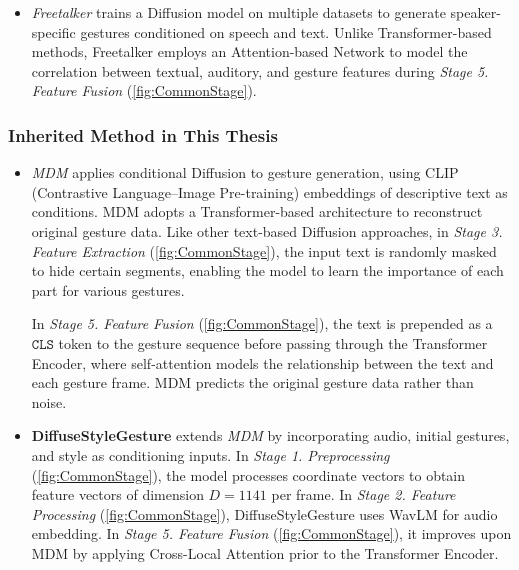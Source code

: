 \begin{itemize}
	\item \textit{Freetalker} \cite{yang2024freetalker} trains a Diffusion model on multiple datasets to generate speaker-specific gestures conditioned on speech and text. Unlike Transformer-based methods, Freetalker employs an Attention-based Network to model the correlation between textual, auditory, and gesture features during \textit{Stage 5. Feature Fusion} (\autoref{fig:CommonStage}).
\end{itemize}

\subsubsection{Inherited Method in This Thesis}

\begin{itemize}
	\item \textit{MDM} \cite{tevet2022human} applies conditional Diffusion to gesture generation, using CLIP (Contrastive Language–Image Pre-training) embeddings of descriptive text as conditions. MDM adopts a Transformer-based architecture to reconstruct original gesture data. Like other text-based Diffusion approaches, in \textit{Stage 3. Feature Extraction} (\autoref{fig:CommonStage}), the input text is randomly masked to hide certain segments, enabling the model to learn the importance of each part for various gestures. 
	
	In \textit{Stage 5. Feature Fusion} (\autoref{fig:CommonStage}), the text is prepended as a $\texttt{CLS}$ token to the gesture sequence before passing through the Transformer Encoder, where self-attention models the relationship between the text and each gesture frame. MDM predicts the original gesture data rather than noise.
	
	\item \textbf{DiffuseStyleGesture} \cite{yang2023diffusestylegesture} extends \textit{MDM} \cite{tevet2022human} by incorporating audio, initial gestures, and style as conditioning inputs. In \textit{Stage 1. Preprocessing} (\autoref{fig:CommonStage}), the model processes coordinate vectors to obtain feature vectors of dimension $D=1141$ per frame. In \textit{Stage 2. Feature Processing} (\autoref{fig:CommonStage}), DiffuseStyleGesture uses WavLM for audio embedding. In \textit{Stage 5. Feature Fusion} (\autoref{fig:CommonStage}), it improves upon MDM by applying Cross-Local Attention prior to the Transformer Encoder.
\end{itemize}
%
